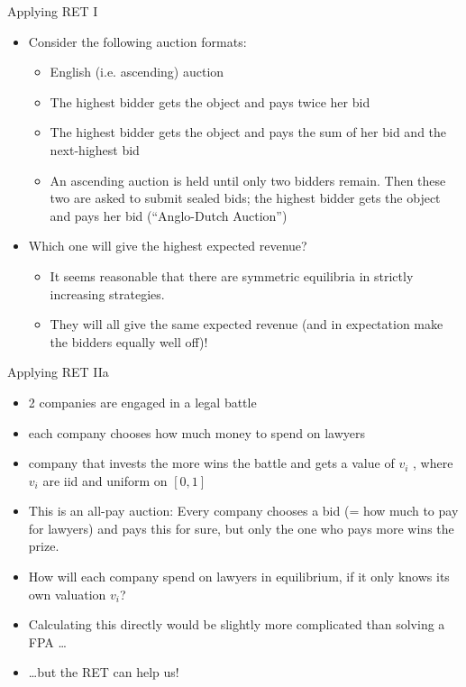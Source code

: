 \documentclass[bigger]{beamer}
\begin{document}
\begin{frame}[label={sec:org94f5caf}]{Applying RET I}
\begin{itemize}
\item Consider the following auction formats:
\begin{itemize}
\item English (i.e. ascending) auction
\item The highest bidder gets the object and pays twice her bid
\item The highest bidder gets the object and pays the sum of her bid and the next-highest bid
\item An ascending auction is held until only two bidders remain. Then these two are asked to submit sealed bids; the highest bidder gets the object and pays her bid (“Anglo-Dutch Auction”)
\end{itemize}
\item Which one will give the highest expected revenue?
\pause
\begin{itemize}
\item It seems reasonable that there are symmetric equilibria in strictly increasing strategies.
\item They will all give the same expected revenue (and in expectation make the bidders equally well off)!
\end{itemize}
\end{itemize}
\end{frame}

\begin{frame}[label={sec:org203af10}]{Applying RET IIa}
\begin{itemize}
\item 2 companies are engaged in a legal battle
\item each company chooses how much money to spend on lawyers
\item company that invests the more wins the battle and gets a value of \(v_i\) , where \(v_i\) are iid and uniform on \([0,1]\)
\item This is an all-pay auction: Every company chooses a bid (= how much to pay for lawyers) and pays this for sure, but only the one who pays more wins the prize.
\item How will each company spend on lawyers in equilibrium, if it only knows its own valuation \(v_i\)?
\item Calculating this directly would be slightly more complicated than solving a FPA \ldots{}
\item \ldots{}but the RET can help us!
\end{itemize}
\end{frame}
\end{document}
